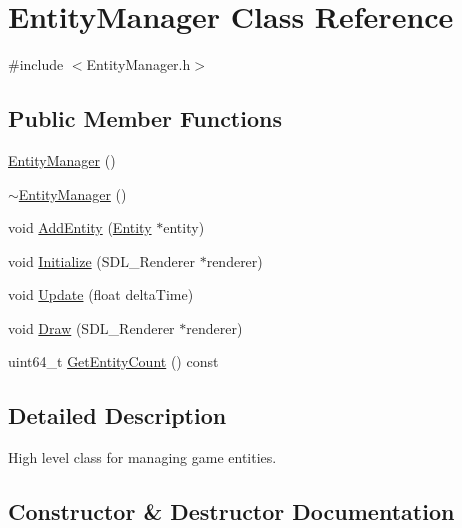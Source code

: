 \hypertarget{class_entity_manager}{}\section{Entity\+Manager Class Reference}
\label{class_entity_manager}


{\ttfamily \#include $<$Entity\+Manager.\+h$>$}

\subsection*{Public Member Functions}
\begin{DoxyCompactItemize}
\item 
\mbox{\hyperlink{class_entity_manager_a7555637657d090171be6ceee8451de0a}{Entity\+Manager}} ()
\item 
\mbox{\hyperlink{class_entity_manager_a71a36c9fb8d579a1a1ec108e0fccf175}{$\sim$\+Entity\+Manager}} ()
\item 
void \mbox{\hyperlink{class_entity_manager_a06dc55d7fe6da1f48ca2a9313c7060e7}{Add\+Entity}} (\mbox{\hyperlink{class_entity}{Entity}} $\ast$entity)
\item 
void \mbox{\hyperlink{class_entity_manager_a0af35630dea63b0b62b1b03fac453a0f}{Initialize}} (S\+D\+L\+\_\+\+Renderer $\ast$renderer)
\item 
void \mbox{\hyperlink{class_entity_manager_a29ee635235a8b76bdf10336d70dbf6ed}{Update}} (float delta\+Time)
\item 
void \mbox{\hyperlink{class_entity_manager_acdea7d35f1b2d2df949f3360c30728ab}{Draw}} (S\+D\+L\+\_\+\+Renderer $\ast$renderer)
\item 
uint64\+\_\+t \mbox{\hyperlink{class_entity_manager_a9657535930969fb7296aa6bb370df1ea}{Get\+Entity\+Count}} () const
\end{DoxyCompactItemize}


\subsection{Detailed Description}
High level class for managing game entities. 

\subsection{Constructor \& Destructor Documentation}
\mbox{\label{class_entity_manager_a7555637657d090171be6ceee8451de0a}} 
